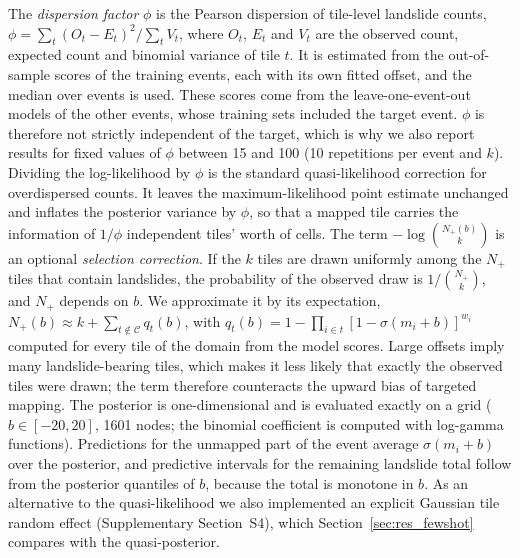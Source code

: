 The \emph{dispersion factor} $\phi$ is the Pearson dispersion of tile-level landslide counts, $\phi=\sum_t (O_t-E_t)^2/\sum_t V_t$, where $O_t$, $E_t$ and $V_t$ are the observed count, expected count and binomial variance of tile $t$. It is estimated from the out-of-sample scores of the training events, each with its own fitted offset, and the median over events is used. These scores come from the leave-one-event-out models of the other events, whose training sets included the target event. $\phi$ is therefore not strictly independent of the target, which is why we also report results for fixed values of $\phi$ between 15 and 100 (10 repetitions per event and $k$). Dividing the log-likelihood by $\phi$ is the standard quasi-likelihood correction for overdispersed counts. It leaves the maximum-likelihood point estimate unchanged and inflates the posterior variance by $\phi$, so that a mapped tile carries the information of $1/\phi$ independent tiles' worth of cells. The term $-\log\binom{N_+(b)}{k}$ is an optional \emph{selection correction}. If the $k$ tiles are drawn uniformly among the $N_+$ tiles that contain landslides, the probability of the observed draw is $1/\binom{N_+}{k}$, and $N_+$ depends on $b$. We approximate it by its expectation, $N_+(b)\approx k+\sum_{t\notin\mathcal{C}} q_t(b)$, with $q_t(b)=1-\prod_{i\in t}[1-\sigma(m_i+b)]^{w_i}$ computed for every tile of the domain from the model scores. Large offsets imply many landslide-bearing tiles, which makes it less likely that exactly the observed tiles were drawn; the term therefore counteracts the upward bias of targeted mapping. The posterior is one-dimensional and is evaluated exactly on a grid ($b\in[-20,20]$, 1601 nodes; the binomial coefficient is computed with log-gamma functions). Predictions for the unmapped part of the event average $\sigma(m_i+b)$ over the posterior, and predictive intervals for the remaining landslide total follow from the posterior quantiles of $b$, because the total is monotone in $b$. As an alternative to the quasi-likelihood we also implemented an explicit Gaussian tile random effect (Supplementary Section~S4), which Section~\ref{sec:res_fewshot} compares with the quasi-posterior.

